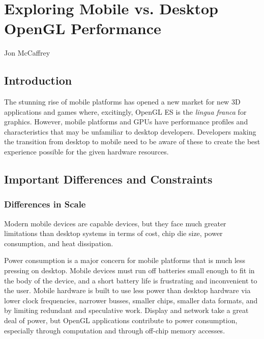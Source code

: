 \chapter{Exploring Mobile vs. Desktop OpenGL Performance}{Jon McCaffrey}
\label{Exploring-Mobile-vs-Desktop-OpenGL-Performance}

\section{Introduction}

The stunning rise of mobile platforms has opened a new market for new 3D
applications and games where, excitingly, OpenGL ES is the \textit{lingua
franca} for graphics. However, mobile platforms and GPUs have performance
profiles and characteristics that may be unfamiliar to desktop developers.
Developers making the transition from desktop to mobile need to be aware of
these to create the best experience possible for the given hardware resources.

\section{Important Differences and Constraints}\label{Jon-McCaffrey:Constraints-Inspire-Creativity}

\subsection{Differences in Scale}
\label{Jon-McCaffrey:Architectural-Differences} Modern mobile devices are
capable devices, but they face much greater limitations than desktop systems in
terms of cost, chip die size, power consumption, and heat dissipation.

Power consumption is a major concern for mobile platforms that is much less
pressing on desktop.  Mobile devices must run off batteries small enough to fit
in the body of the device, and a short battery life is frustrating and
inconvenient to the user.  Mobile hardware is built to use less power than
desktop hardware via lower clock frequencies, narrower busses, smaller chips,
smaller data formats, and by limiting redundant and speculative work.  Display
and network take a great deal of power, but OpenGL applications contribute to
power consumption, especially through computation and through off-chip memory
accesses.

